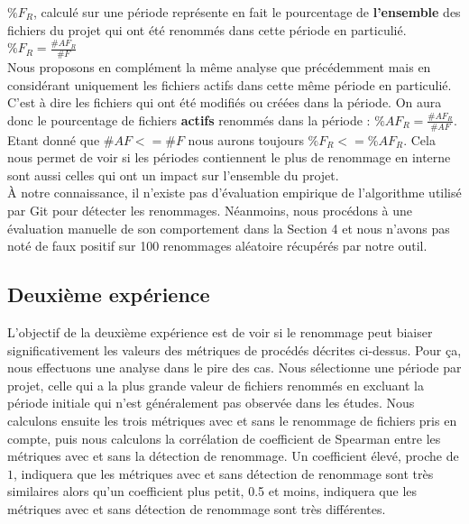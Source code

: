 $\%F_{R}$, calculé sur une période représente en fait le pourcentage de \textbf{l'ensemble} des fichiers du projet qui ont été renommés dans cette période en particulié. $\%F_{R} = \frac{\#AF_{R}}{\#F}$ \\

Nous proposons en complément la même analyse que précédemment mais en considérant uniquement les fichiers actifs dans cette même période en particulié. C'est à dire les fichiers qui ont été modifiés ou créées dans la période. On aura donc le pourcentage de fichiers \textbf{actifs} renommés dans la période : 
$\%AF_{R} = \frac{\#AF_{R}}{\#AF}$. \\
Etant donné que ${\#AF} <= {\#F}$ nous aurons toujours $\%F_{R} <= \%AF_{R}$. Cela nous permet de voir si les périodes contiennent le plus de renommage en interne sont aussi celles qui ont un impact sur l'ensemble du projet.\\

À notre connaissance, il n'existe pas d'évaluation empirique de l'algorithme utilisé par Git pour détecter les renommages. Néanmoins, nous procédons à une évaluation manuelle de son comportement dans la Section 4 et nous n'avons pas noté de faux positif sur 100 renommages aléatoire récupérés par notre outil.\\

\subsection{Deuxième expérience}

L'objectif de la deuxième expérience est de voir si le renommage peut biaiser significativement les valeurs des métriques de procédés décrites ci-dessus. Pour ça, nous effectuons une analyse dans le pire des cas. Nous sélectionne une période par projet, celle qui a la plus grande valeur de fichiers renommés en excluant la période initiale qui n'est généralement pas observée dans les études. Nous calculons ensuite les trois métriques avec et sans le renommage de fichiers pris en compte, puis nous calculons la corrélation de coefficient de Spearman entre les métriques avec et sans la détection de renommage. Un coefficient élevé, proche de $1$, indiquera que les métriques avec et sans détection de renommage sont très similaires alors qu'un coefficient plus petit, 0.5 et moins, indiquera que les métriques avec et sans détection de renommage sont très différentes.\\  
